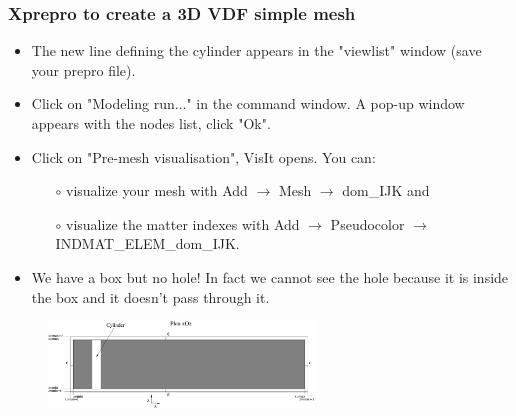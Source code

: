 \documentclass[10pt]{beamer}
\begin{document}
\begin{frame}
\frametitle{Xprepro to create a 3D VDF simple mesh}
\begin{block}{}

\begin{itemize}
\item The new line defining the cylinder appears in the "viewlist" window (save your prepro file).
\item Click on "Modeling run..." in the command window. A pop-up window appears with the nodes list, click "Ok".
\item Click on "Pre-mesh visualisation", VisIt opens. You can:
    \begin{itemize}
    \item [$\circ$] visualize your mesh with Add $\rightarrow$ Mesh $\rightarrow$ dom\_IJK and
    \item [$\circ$] visualize the matter indexes with Add $\rightarrow$ Pseudocolor $\rightarrow$ INDMAT\_ELEM\_dom\_IJK.
    \end{itemize}
\item We have a box but no hole! In fact we cannot see the hole because it is inside the box and it doesn't pass through it.
\end{itemize}

\begin{figure}
\includegraphics[width=0.63\textwidth]{PICTURES/xprepro2.pdf}
\end{figure}

\end{block}
\end{frame}
\end{document}
